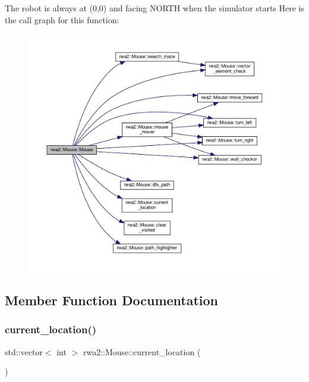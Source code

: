 The robot is always at (0,0) and facing N\+O\+R\+TH when the simulator starts Here is the call graph for this function\+:
\nopagebreak
\begin{figure}[H]
\begin{center}
\leavevmode
\includegraphics[width=350pt]{classrwa2_1_1_mouse_a048dffae3aaa3a6ddc2c6cc4741a097c_cgraph}
\end{center}
\end{figure}


\subsection{Member Function Documentation}
\mbox{\label{classrwa2_1_1_mouse_a6c4e22fb4f67a100c011b634508a5c07}} 
\subsubsection{\texorpdfstring{current\+\_\+location()}{current\_location()}}
{\footnotesize\ttfamily std\+::vector$<$ int $>$ rwa2\+::\+Mouse\+::current\+\_\+location (\begin{DoxyParamCaption}{ }\end{DoxyParamCaption})}



